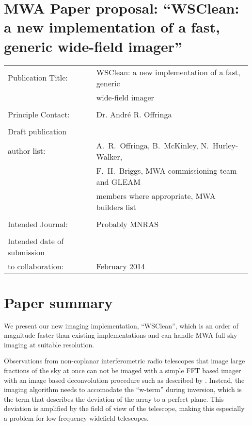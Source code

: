 \documentclass[a4paper,10pt]{article}
\begin{document}
\label{firstpage}
\section*{MWA Paper proposal: ``WSClean: a new implementation of a fast, generic wide-field imager''}
\begin{tabular}{ll}
Publication Title: & WSClean: a new implementation of a fast, generic \\
                   & wide-field imager\\
                   & \\
Principle Contact: & Dr. Andr\'e R. Offringa \\
                   & \\
Draft publication\\
\hspace{5mm}author list: & A.~R.~Offringa, B.~McKinley, N.~Hurley-Walker, \\
                         & F.~H.~Briggs, MWA commissioning team and GLEAM \\
                         & members where appropriate, MWA builders list \\
                   & \\
Intended Journal: & Probably MNRAS\\
                   & \\
Intended date of submission\\
\hspace{5mm}to collaboration: & February 2014\\
\end{tabular}

\section*{Paper summary}
We present our new imaging implementation, ``WSClean'', which is an order of magnitude faster than existing implementations and can handle MWA full-sky imaging at suitable resolution.

Observations from non-coplanar interferometric radio telescopes that image large fractions of the sky at once can not be imaged with a simple FFT based imager with an image based deconvolution procedure such as described by \citet{hogbom-clean}. Instead, the imaging algorithm needs to accomodate the ``w-term'' during inversion, which is the term that describes the deviation of the array to a perfect plane. This deviation is amplified by the field of view of the telescope, making this especially a problem for low-frequency widefield telescopes.
\end{document}
